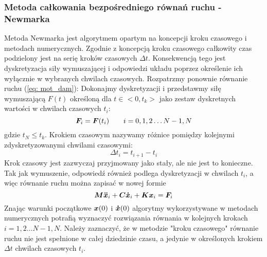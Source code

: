 \subsubsection{Metoda całkowania bezpośredniego równań ruchu - Newmarka}
Metoda Newmarka jest algorytmem opartym na koncepcji kroku czasowego i metodach numerycznych. Zgodnie z koncepcją kroku czasowego całkowity czas podzielony jest na serię kroków czasowych $\Delta t$. Konsekwencją tego jest dyskretyzacja siły wymuszającej i odpowiedzi układu poprzez określenie ich wyłącznie w wybranych chwilach czasowych. Rozpatrzmy ponownie równanie ruchu (\ref{eq: mot_dam}):
Dokonajmy dyskretyzacji i przedstawmy siłę wymuszającą $F(t)$ określoną dla $t\in<0,t_k>$ jako zestaw dyskretnych wartości w chwilach czasowych $t_i$:
\begin{equation}
	\bm{F}_i=\bm{F}(t_i) \qquad i = 0,1,2\dots N-1,N
\end{equation}
gdzie $t_N\leq t_k$. Krokiem czasowym nazywamy różnice pomiędzy kolejnymi zdyskretyzowanymi chwilami czasowymi:
\begin{equation}
	\Delta t_i = t_{i+1}-t_i
\end{equation}
Krok czasowy jest zazwyczaj przyjmowany jako stały, ale nie jest to konieczne. Tak jak wymuszenie, odpowiedź również podlega dyskretyzacji w chwilach $t_i$, a więc równanie ruchu można zapisać w nowej formie
\begin{equation} \label{eq: motion_time_step}
	\bm{M}\bm{\ddot{x}}_i+\bm{C}\bm{\dot{x}}_i+\bm{K}\bm{x}_i = \bm{F}_i
\end{equation}
Znając warunki początkowe $\bm{x}(0)$ i $\bm{\dot{x}}(0)$ algorytmy wykorzystywane w metodach numerycznych potrafią wyznaczyć rozwiązania równania w kolejnych krokach $i = 1,2\dots N-1,N$. Należy zaznaczyć, że w metodzie "kroku czasowego" równanie ruchu nie jest spełnione w całej dziedzinie czasu, a jedynie w określonych krokiem $\Delta t$ chwilach czasowych $t_i$.

